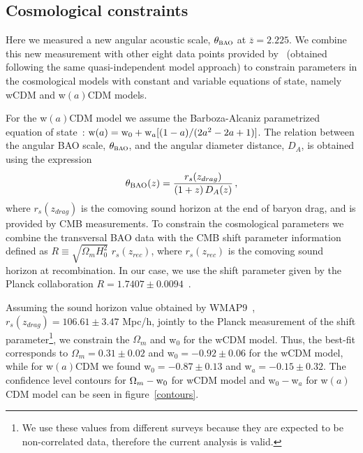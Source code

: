 \documentclass[a4paper,11pt]{article}
\begin{document}
\subsection{Cosmological constraints}\label{CC}

\noindent
Here we measured a new angular acoustic scale, $\theta_{\mbox{\footnotesize\sc bao}}$ at 
$\overline{z} = 2.225$. 
We combine this new measurement with other eight data points provided by~\cite{Carvalho,Alcaniz} 
(obtained following the same quasi-independent model approach) to constrain parameters in the 
cosmological models with constant and variable equations of state, namely wCDM and w$(a)$CDM 
models. 

\noindent
For the w$(a)$CDM model we assume the Barboza-Alcaniz parametrized equation of 
state~\cite{BarbozaAlcaniz}: 
${\rm w}(a) = {\rm w}_0 + {\rm w}_a [(1- a) / (2a^2 - 2a + 1)]$. 
The relation between the angular BAO scale, $\theta_{\mbox{\footnotesize\sc bao}}$, and the angular 
diameter distance, $D_A$, is obtained using the expression 
\begin{equation}
 \theta_{\rm BAO}(z) = \frac{r_s(z_{drag})}{(1+z) \, D_A(z)} \, ,
\end{equation} 
where $r_s(z_{drag})$ is the comoving sound horizon at the end of baryon drag, and is provided by CMB 
measurements. 
To constrain the cosmological parameters we combine the transversal BAO data with the CMB shift 
parameter information defined as $R \equiv \sqrt{\Omega_m H_0^2} \,\, r_s(z_{rec})$, where 
$r_s(z_{rec})$ is the comoving sound horizon at recombination. 
In our case, we use the shift parameter given by the Planck collaboration 
$R = 1.7407 \pm 0.0094$~\cite{Wang2013}. 

Assuming the sound horizon value obtained by WMAP9~\cite{wmap9}, $r_s(z_{drag}) = 106.61 \pm 3.47$ Mpc/h, 
jointly to the Planck measurement of the shift parameter\footnote{We use these values from different 
surveys because they are expected to be non-correlated data, therefore the current analysis is valid.}, 
we constrain the $\Omega_m$ and w$_0$ for the wCDM model. 
Thus, the best-fit corresponds to $\Omega_m= 0.31 \pm 0.02$ and w$_0 = -0.92 \pm 0.06$ 
for the wCDM model, while for w$(a)$CDM we found w$_0= -0.87\pm 0.13$ and 
w$_a= -0.15\pm 0.32$. 
The confidence level contours for $\Omega_m-\mbox{\rm w}_0$ for wCDM model and w$_0-$w$_a$ 
for w$(a)$CDM model can be seen in figure~\ref{contours}. 
\end{document}
